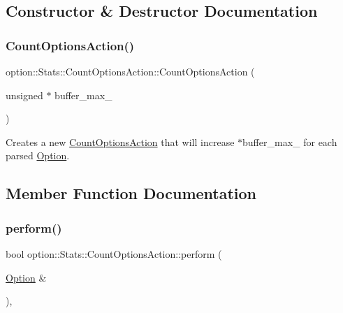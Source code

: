 \subsection{Constructor \& Destructor Documentation}
\mbox{\label{classoption_1_1Stats_1_1CountOptionsAction_a24a38b87ad129b0e12660bd2019ba284}} 
\subsubsection{\texorpdfstring{Count\+Options\+Action()}{CountOptionsAction()}}
{\footnotesize\ttfamily option\+::\+Stats\+::\+Count\+Options\+Action\+::\+Count\+Options\+Action (\begin{DoxyParamCaption}\item[{unsigned $\ast$}]{buffer\+\_\+max\+\_\+ }\end{DoxyParamCaption})\hspace{0.3cm}{\ttfamily [inline]}}

Creates a new \hyperlink{classoption_1_1Stats_1_1CountOptionsAction}{Count\+Options\+Action} that will increase {\ttfamily $\ast$buffer\+\_\+max\+\_\+} for each parsed \hyperlink{classoption_1_1Option}{Option}. 

\subsection{Member Function Documentation}
\mbox{\label{classoption_1_1Stats_1_1CountOptionsAction_a29ab8a68d0a30736b99b4d2e5dece489}} 
\subsubsection{\texorpdfstring{perform()}{perform()}}
{\footnotesize\ttfamily bool option\+::\+Stats\+::\+Count\+Options\+Action\+::perform (\begin{DoxyParamCaption}\item[{\hyperlink{classoption_1_1Option}{Option} \&}]{ }\end{DoxyParamCaption})\hspace{0.3cm}{\ttfamily [inline]}, {\ttfamily [virtual]}}



